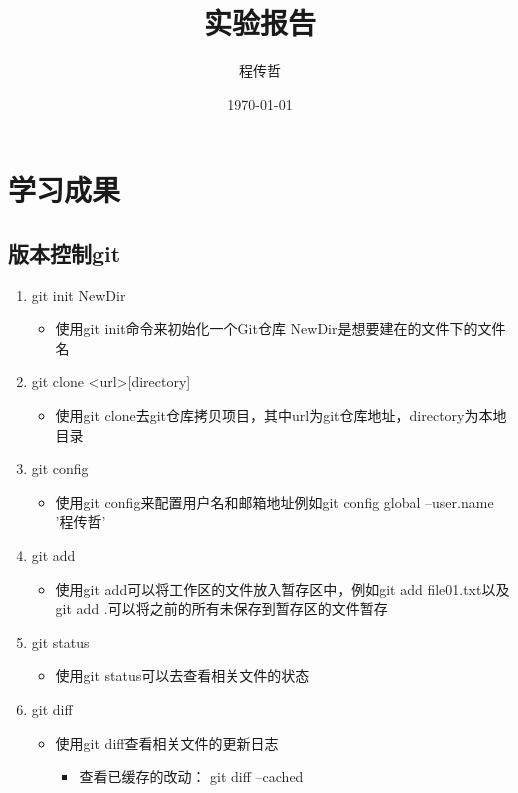\documentclass[a4paper, 12pt]{article}
\begin{document}
    {\huge\title{实验报告}}
    {\large\author{程传哲}}
    \date{\today}
    \maketitle
\section{学习成果}

\subsection{版本控制git}
\begin{enumerate}
  \item {\large git init NewDir} 
    \begin{itemize}
      \item 使用git init命令来初始化一个Git仓库 NewDir是想要建在的文件下的文件名
    \end{itemize}
  \item {\large git clone \textless url\textgreater [directory]}
    \begin{itemize}
      \item 使用git clone去git仓库拷贝项目，其中url为git仓库地址，directory为本地目录
    \end{itemize}
  \item {\large git config}
    \begin{itemize}
      \item 使用git config来配置用户名和邮箱地址例如git config global --user.name '程传哲'
    \end{itemize}
  \item{\large git add}
    \begin{itemize}
      \item 使用git add可以将工作区的文件放入暂存区中，例如git add file01.txt以及git add .可以将之前的所有未保存到暂存区的文件暂存
    \end{itemize}
  \item{\large git status}
    \begin{itemize}
      \item 使用git status可以去查看相关文件的状态
    \end{itemize}
  \item{\large git diff}
    \begin{itemize}
      \item 使用git diff查看相关文件的更新日志
        \begin{itemize}
          \item 查看已缓存的改动： git diff --cached

\end{itemize}
\end{itemize}
\end{enumerate}
\end{document}
